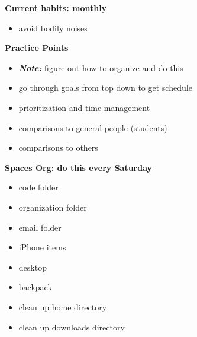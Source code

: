 \textbf{Current habits: monthly}\\
\begin{itemize}
\item avoid bodily noises
\end{itemize}

\textbf{Practice Points}\\
\begin{itemize}
\item \textit{\textbf{Note:}} figure out how to organize and do this
\item go through goals from top down to get schedule
\item prioritization and time management
\item comparisons to general people (students)
\item comparisons to others
\end{itemize}

\textbf{Spaces Org: do this every Saturday }
\begin{itemize}
\item code folder
\item organization folder
\item email folder
\item iPhone items
\item desktop
\item backpack
\item clean up home directory
\item clean up downloads directory
\end{itemize}

